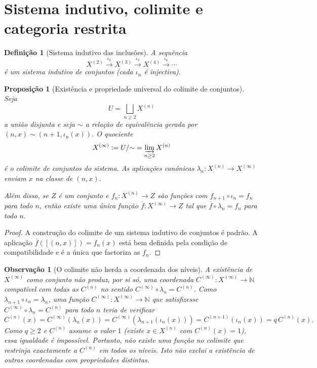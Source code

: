 \documentclass[11pt,a4paper]{article}
\newtheorem{definicao}{Definição}
\newtheorem{proposicao}{Proposição}
\newtheorem{observacao}{Observação}
\begin{document}
\section{Sistema indutivo, colimite e categoria restrita}
\label{sec:categoria}

\begin{definicao}[Sistema indutivo das inclusões]
\label{def:sistema-indutivo}
A sequência
\[
X^{(2)}\xrightarrow{\iota_2}X^{(3)}\xrightarrow{\iota_3}X^{(4)}\xrightarrow{\iota_4}\cdots
\]
é um sistema indutivo de conjuntos (cada \(\iota_n\) é injectiva).
\end{definicao}

\begin{proposicao}[Existência e propriedade universal do colimite de conjuntos]
\label{prop:colimite-conjuntos}
Seja
\[
U=\bigsqcup_{n\ge 2}X^{(n)}
\]
a união disjunta e seja \(\sim\) a relação de equivalência gerada por
\((n,x)\sim(n+1,\iota_n(x))\).
O quociente
\[
X^{(\infty)}
:=
U/{\sim}
=
\varinjlim_{n\ge 2}X^{(n)}
\]
é o colimite de conjuntos do sistema.
As aplicações canónicas \(\lambda_n\colon X^{(n)}\to X^{(\infty)}\) enviam
\(x\) na classe de \((n,x)\).

Além disso, se \(Z\) é um conjunto e \(f_n\colon X^{(n)}\to Z\) são funções
com \(f_{n+1}\circ\iota_n=f_n\) para todo \(n\), então existe uma única
função \(\overline f\colon X^{(\infty)}\to Z\) tal que
\(\overline f\circ\lambda_n=f_n\) para todo \(n\).
\end{proposicao}

\begin{proof}
A construção do colimite de um sistema indutivo de conjuntos é padrão.
A aplicação \(\overline f([(n,x)])=f_n(x)\) está bem definida pela condição
de compatibilidade e é a única que factoriza as \(f_n\).
\end{proof}

\begin{observacao}[O colimite não herda a coordenada dos níveis]
\label{obs:colimite-coordenada}
A existência de \(X^{(\infty)}\) como conjunto não produz, por si só, uma
coordenada
\(C^{(\infty)}\colon X^{(\infty)}\to\mathbb N\)
compatível com todas as \(C^{(n)}\) no sentido
\(C^{(\infty)}\circ\lambda_n=C^{(n)}\).
Como \(\lambda_{n+1}\circ\iota_n=\lambda_n\), uma função
\(C^{(\infty)}\colon X^{(\infty)}\to\mathbb N\) que satisfizesse
\(C^{(\infty)}\circ\lambda_n=C^{(n)}\) para todo \(n\) teria de verificar
\[
C^{(n)}(x)
=C^{(\infty)}(\lambda_n(x))
=C^{(\infty)}(\lambda_{n+1}(\iota_n(x)))
=C^{(n+1)}(\iota_n(x))
=q\,C^{(n)}(x).
\]
Como \(q\ge 2\) e \(C^{(n)}\) assume o valor \(1\) (existe \(x\in X^{(n)}\)
com \(C^{(n)}(x)=1\)), essa igualdade é impossível.
Portanto, não existe uma função no colimite que restrinja exactamente a
\(C^{(n)}\) em todos os níveis.
Isto não exclui a existência de outras coordenadas com propriedades
distintas.
\end{observacao}
\end{document}
